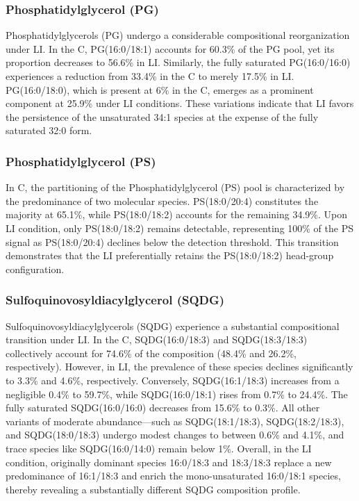 \documentclass[10pt,letterpaper]{article}
\begin{document}
\subsubsection*{Phosphatidylglycerol (PG)} 
Phosphatidylglycerols (PG) undergo a considerable compositional reorganization under LI. In the  C, PG(16:0/18:1) accounts for 60.3\% of the PG pool, yet its proportion decreases to 56.6\% in LI. Similarly, the fully saturated PG(16:0/16:0) experiences a reduction from 33.4\% in the C to merely 17.5\% in LI. PG(16:0/18:0), which is present at 6\% in the C, emerges as a prominent component at 25.9\% under LI conditions. These variations indicate that LI favors the persistence of the unsaturated 34:1 species at the expense of the fully saturated 32:0 form.

\subsubsection*{Phosphatidylglycerol (PS)} 
In C, the partitioning of the Phosphatidylglycerol (PS) pool is characterized by the predominance of two molecular species. PS(18:0/20:4) constitutes the majority at 65.1\%, while PS(18:0/18:2) accounts for the remaining 34.9\%. Upon LI condition, only PS(18:0/18:2) remains detectable, representing 100\% of the PS signal as PS(18:0/20:4) declines below the detection threshold. This transition demonstrates that the LI preferentially retains the PS(18:0/18:2) head-group configuration.

\subsubsection*{Sulfoquinovosyldiacylglycerol (SQDG)} 
Sulfoquinovosyldiacylglycerols (SQDG) experience a substantial compositional transition under LI. In the C, SQDG(16:0/18:3) and SQDG(18:3/18:3) collectively account for 74.6\% of the composition (48.4\% and 26.2\%, respectively). However, in LI, the prevalence of these species declines significantly to 3.3\% and 4.6\%, respectively. Conversely, SQDG(16:1/18:3) increases from a negligible 0.4\% to 59.7\%, while SQDG(16:0/18:1) rises from 0.7\% to 24.4\%. The fully saturated SQDG(16:0/16:0) decreases from 15.6\% to 0.3\%. All other variants of moderate abundance—such as SQDG(18:1/18:3), SQDG(18:2/18:3), and SQDG(18:0/18:3) undergo modest changes to between 0.6\% and 4.1\%, and trace species like SQDG(16:0/14:0) remain below 1\%. Overall, in the LI condition, originally dominant species 16:0/18:3 and 18:3/18:3 replace a new predominance of 16:1/18:3 and enrich the mono-unsaturated 16:0/18:1 species, thereby revealing a substantially different SQDG composition profile.
\end{document}
